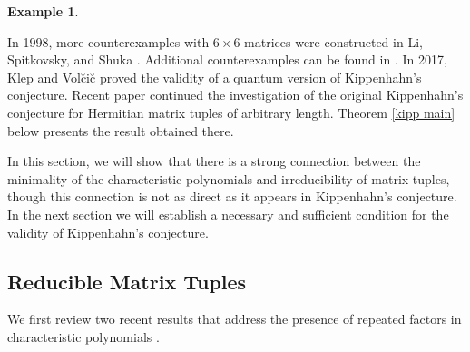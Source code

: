 \documentclass[draft, 12pt, reqno]{amsart}
\numberwithin{equation}{section}
\theoremstyle{plain}
\newtheorem{example}[theorem]{Example}
\begin{document}
\begin{example}

\end{example}

In 1998, more counterexamples with $6\times 6$ matrices were constructed in Li, Spitkovsky, and Shuka \cite{LSS}. Additional counterexamples can be found in \cite{Law}. In 2017, Klep and Vol\u{c}i\u{c} \cite{KVo1} proved the validity of a quantum version of Kippenhahn's conjecture. Recent paper \cite{S2} continued the investigation of the original Kippenhahn's conjecture for Hermitian matrix tuples of arbitrary length. 
Theorem \ref{kipp main}  below presents the result obtained there. 

In this section, we will show that there is a strong connection between the minimality of the characteristic polynomials and irreducibility of matrix tuples, though this connection is not as direct as it appears in Kippenhahn's conjecture. In  the next section  we will establish a necessary and sufficient condition for the validity of Kippenhahn's conjecture.



\subsection{Reducible Matrix Tuples}\label{6.6}

We first review two recent results that address the presence of repeated factors in characteristic polynomials \cite{S2}. 
\end{document}
